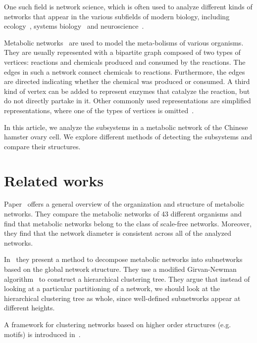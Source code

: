 One such field is network science, which
is often used to analyze different kinds of networks that appear in the various
subfields of modern biology, including ecology~\cite{proulx2005network}, systems
biology~\cite{barabasi2004network} and neuroscience~\cite{sporns2014contributions}.

Metabolic networks~\cite{jeong2000large} are used to model the meta-bolisms of
various organisms. They are usually represented with a bipartite graph composed
of two types of vertices: reactions and chemicals produced and consumed by the
reactions. The edges in such a network connect chemicals to
reactions. Furthermore, the edges are directed indicating whether the chemical
was produced or consumed. A third kind of vertex can be added to represent
enzymes that catalyze the reaction, but do not directly partake in
it. Other commonly used representations are simplified representations, where
one of the types of vertices is omitted~\cite{newman2010networks}.

In this article, we analyze the subsystems in a metabolic network of the
Chinese hamster ovary cell. We explore different methods of detecting the
subsystems and compare their structures.

\section{Related works}

Paper~\cite{jeong2000large} offers a general overview of the organization and structure of metabolic networks. 
They compare the metabolic networks of 43 different organisms and find that
metabolic networks belong to the class of scale-free networks. Moreover, they find that the network diameter is
consistent across all of the analyzed networks. 

In~\cite{holme2003subnetwork} they present a method to decompose metabolic networks into subnetworks based on the global network structure. They use a modified Girvan-Newman algorithm~\cite{girvan2002community} to construct a hierarchical clustering tree. They argue that instead of looking at a particular partitioning of a network, we should look at the hierarchical clustering tree as whole, since well-defined subnetworks appear at different heights.

A framework for clustering networks based on higher order structures (e.g. motifs) is introduced in~\cite{benson2016higher}.

